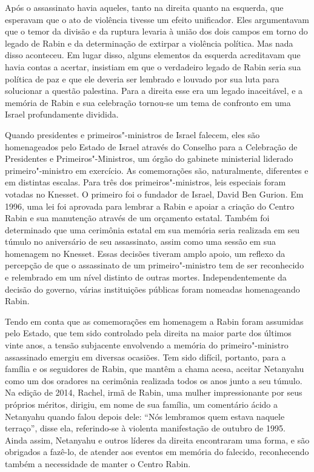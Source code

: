Após o assassinato havia aqueles, tanto na direita quanto na esquerda,
que esperavam que o ato de violência tivesse um efeito unificador. Eles
argumentavam que o temor da divisão e da ruptura levaria à união dos dois campos
em torno do legado de Rabin e da determinação de extirpar a
violência política. Mas nada disso aconteceu. Em lugar disso, alguns
elementos da esquerda acreditavam que havia contas a acertar, insistiam
em que o verdadeiro legado de Rabin seria sua política de paz e
que ele deveria ser lembrado e louvado por sua luta para solucionar a
questão palestina. Para a direita esse era um legado inaceitável, e a
memória de Rabin e sua celebração tornou-se um tema de confronto em uma
Israel profundamente dividida.

Quando presidentes e primeiros"-ministros de Israel falecem, eles são
homenageados pelo Estado de Israel através do Conselho para a Celebração
de Presidentes e Primeiros"-Ministros, um órgão do gabinete ministerial
liderado primeiro"-ministro em exercício. As comemorações
são, naturalmente, diferentes e em distintas escalas. Para três dos
primeiros"-ministros, leis especiais foram votadas no Knesset. O primeiro
foi o fundador de Israel, David Ben Gurion. Em 1996, uma lei foi aprovada
para lembrar a Rabin e apoiar a criação do Centro Rabin e sua
manutenção através de um orçamento estatal. Também foi determinado que
uma cerimônia estatal em sua memória seria realizada em seu túmulo no
aniversário de seu assassinato, assim como uma sessão em sua homenagem
no Knesset. Essas decisões tiveram amplo apoio, um reflexo da percepção
de que o assassinato de um primeiro"-ministro tem de ser reconhecido e
relembrado em um nível distinto de outras mortes. Independentemente da
decisão do governo, várias instituições públicas foram nomeadas
homenageando Rabin.

Tendo em conta que as comemorações em homenagem a Rabin foram assumidas
pelo Estado, que tem sido controlado pela direita na maior
parte dos últimos vinte anos, a tensão subjacente envolvendo a memória
do primeiro"-ministro assassinado emergiu em diversas ocasiões. Tem sido difícil, portanto, para
a família e os seguidores de Rabin, que mantêm a chama acesa, aceitar
Netanyahu como um dos oradores na cerimônia realizada todos os anos
junto a seu túmulo. Na edição de 2014, Rachel, irmã de
Rabin, uma mulher impressionante por seus próprios méritos, dirigiu, em nome de sua família, um
comentário ácido a Netanyahu quando falou depois dele:
``Nós lembramos quem estava naquele terraço'', disse
ela, referindo-se à violenta manifestação de outubro de 1995. Ainda
assim, Netanyahu e outros líderes da direita encontraram uma forma, e são
obrigados a fazê-lo, de atender aos eventos em memória do falecido,
reconhecendo também a necessidade de manter o Centro Rabin.

